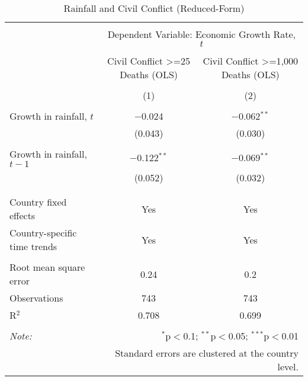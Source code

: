
\begin{table}[!htbp] \centering 
  \caption{Rainfall and Civil Conflict (Reduced-Form)} 
  \label{} 
\begin{tabular}{@{\extracolsep{5pt}}lcc} 
\\[-1.8ex]\hline 
\hline \\[-1.8ex] 
 & \multicolumn{2}{c}{Dependent Variable: Economic Growth Rate, $t$} \\ 
\cline{2-3} 
\\[-1.8ex] & Civil Conflict >=25 Deaths (OLS) & Civil Conflict >=1,000 Deaths (OLS) \\ 
\\[-1.8ex] & (1) & (2)\\ 
\hline \\[-1.8ex] 
 Growth in rainfall, $t$ & $-$0.024 & $-$0.062$^{**}$ \\ 
  & (0.043) & (0.030) \\ 
  & & \\ 
 Growth in rainfall, $t-1$ & $-$0.122$^{**}$ & $-$0.069$^{**}$ \\ 
  & (0.052) & (0.032) \\ 
  & & \\ 
\hline \\[-1.8ex] 
Country fixed effects & Yes & Yes \\ 
Country-specific time trends & Yes & Yes \\ 
\hline \\[-1.8ex] 
Root mean square error & 0.24 & 0.2 \\ 
Observations & 743 & 743 \\ 
R$^{2}$ & 0.708 & 0.699 \\ 
\hline 
\hline \\[-1.8ex] 
\textit{Note:}  & \multicolumn{2}{r}{$^{*}$p$<$0.1; $^{**}$p$<$0.05; $^{***}$p$<$0.01} \\ 
 & \multicolumn{2}{r}{Standard errors are clustered at the country level.} \\ 
\end{tabular} 
\end{table} 
